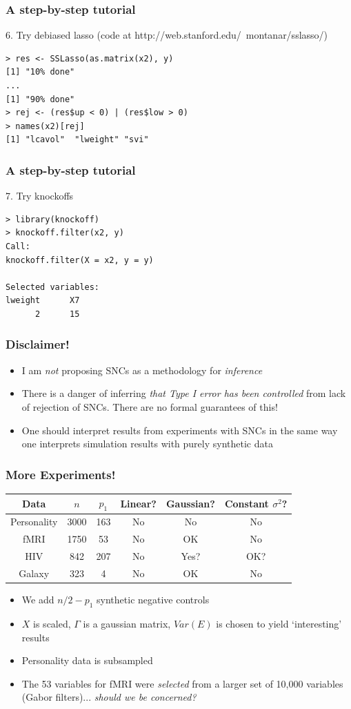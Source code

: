 \documentclass{beamer}
\begin{document}
\begin{frame}[fragile]
\frametitle{A step-by-step tutorial}
6. Try debiased lasso (code at http://web.stanford.edu/~montanar/sslasso/)
\begin{verbatim}
> res <- SSLasso(as.matrix(x2), y)
[1] "10% done"
...
[1] "90% done"
> rej <- (res$up < 0) | (res$low > 0)
> names(x2)[rej]
[1] "lcavol"  "lweight" "svi"    
\end{verbatim}
\end{frame}

\begin{frame}[fragile]
\frametitle{A step-by-step tutorial}
7. Try knockoffs
\begin{verbatim}
> library(knockoff)
> knockoff.filter(x2, y)
Call:
knockoff.filter(X = x2, y = y)

Selected variables:
lweight      X7 
      2      15 
\end{verbatim}
\end{frame}

\begin{frame}
\frametitle{Disclaimer!}
\begin{itemize}
\item I am \emph{not} proposing SNCs as a methodology for \emph{inference}
\item There is a danger of inferring \emph{that Type I error has been controlled} from lack of rejection of SNCs.
There are no formal guarantees of this!
\item One should interpret results from experiments with SNCs in the same way one interprets simulation results with purely synthetic data
\end{itemize}
\end{frame}

\begin{frame}
\frametitle{More Experiments!}
\begin{center}
\begin{tabular}{|c|c|c|c|c|c|}
\hline
Data & $n$ & $p_1$ & Linear? & Gaussian? & Constant $\sigma^2$?\\ \hline
Personality & 3000 & 163 & No & No & No\\ \hline
fMRI & 1750 & 53 & No & OK & No \\ \hline
HIV & 842 & 207 & No & Yes? & OK? \\ \hline
Galaxy & 323 & 4 & No & OK & No \\ \hline
\end{tabular}
\end{center}
\begin{itemize}
\item We add $n/2 - p_1$ synthetic negative controls
\item $X$ is scaled, $\Gamma$ is a gaussian matrix, $Var(E)$ is chosen to yield `interesting' results
\item Personality data is subsampled
\item The 53 variables for fMRI were \emph{selected} from a larger set
  of 10,000 variables (Gabor filters)... \emph{should we be
    concerned?}
\end{itemize}
\end{frame}
\end{document}

